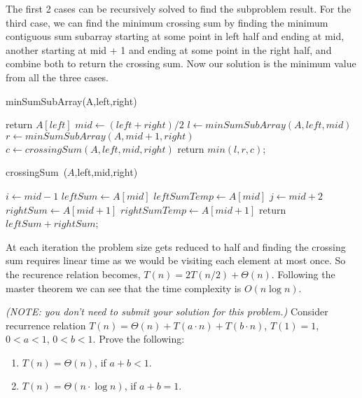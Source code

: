 \documentclass[11pt]{article}
\begin{document}
\begin{qunlist}
The first 2 cases can be recursively solved to find the subproblem result. For the third case, we can find the minimum crossing sum by finding the minimum contiguous sum subarray starting at some point in left half and ending at  mid, another starting at mid + 1 and ending at some point in the right half, and combine both to return the crossing sum. Now our solution is the minimum value from all the three cases.
\begin{algorithm}
\caption{minSumSubArray(A,left,right)}\label{alg:two}
{ {return $A[left]$}}
$mid \gets (left+right)/2$\;
$l \gets minSumSubArray(A, left, mid)$\;
$r \gets minSumSubArray(A, mid+1, right)$\;
$c \gets crossingSum(A,left, mid, right)$\;
return $min(l,r,c)$;
\end{algorithm}

\begin{algorithm}
\caption{crossingSum~($A$,left,mid,right)}\label{alg:two2}
$i \gets mid-1$\;
$leftSum \gets A[mid]$\; 
$leftSumTemp \gets A[mid]$\;
$j \gets mid+2$\;
$rightSum \gets A[mid+1]$\;
$rightSumTemp \gets A[mid+1]$\;
return $leftSum+rightSum$; 
\end{algorithm}

At each iteration the problem size gets reduced to half and finding the crossing sum requires linear time as we would be visiting each element at most once. So the recurence relation becomes, $T(n) = 2T(n/2) + \Theta(n)$. Following the master theorem we can see that the time complexity is $O(n\log n)$.

\newpage
\emph{(NOTE: you don't need to submit your solution for this problem.)}
Consider recurrence relation $T(n) = \Theta(n) + T(a\cdot n) + T(b\cdot n)$, $T(1) = 1$, {$0 < a < 1$, $0< b< 1$}.
Prove the following:
\begin{enumerate}
\item $T(n) = \Theta(n)$, if $a + b < 1$.
\item $T(n) = \Theta(n\cdot \log n)$, if $a + b = 1$.
\end{enumerate}


\end{qunlist}
\end{document}
